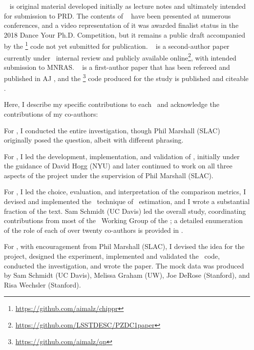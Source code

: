 \chapname~ is original material developed initially as lecture notes and ultimately intended for submission to PRD.
The contents of \chapname~ have been presented at numerous conferences, and a video representation of it was awarded finalist status in the 2018 Dance Your Ph.D. Competition, but it remains a public draft \citep{malz_cosmological_2018} accompanied by the \chippr\footnote{\url{https://github.com/aimalz/chippr}} code not yet submitted for publication.
\chapname~ is a second-author paper currently under \desc\ internal review and publicly available online\footnote{\url{https://github.com/LSSTDESC/PZDC1paper}}, with intended submission to MNRAS.
\chapname~ is a first-author paper that has been refereed and published in AJ \citep{malz_approximating_2018}, and the \qp\footnote{\url{https://github.com/aimalz/qp}} code produced for the study is published and citeable \citep{malz_qp_2017}.

Here, I describe my specific contributions to each \chapname\ and acknowledge the contributions of my co-authors:
\begin{enumerate}

{\item For , I conducted the entire investigation, though Phil Marshall (SLAC) originally posed the question, albeit with different phrasing.}

{\item For , I led the development, implementation, and validation of \Chippr, initially under the guidance of David Hogg (NYU) and later continued to work on all three aspects of the project under the supervision of Phil Marshall (SLAC).}

{\item For , I led the choice, evaluation, and interpretation of the comparison metrics, I devised and implemented the \trainz\ technique of \pzpdf\ estimation, and I wrote a substantial fraction of the text.
	Sam Schmidt (UC Davis) led the overall study, coordinating contributions from most of the \Pz\ Working Group of the \desc; a detailed enumeration of the role of each of over twenty co-authors is provided in .}

{\item For , with encouragement from Phil Marshall (SLAC), I devised the idea for the project, designed the experiment, implemented and validated the \qp\ code, conducted the investigation, and wrote the paper.
	The mock data was produced by Sam Schmidt (UC Davis), Melissa Graham (UW), Joe DeRose (Stanford), and Risa Wechsler (Stanford).}

\end{enumerate}
